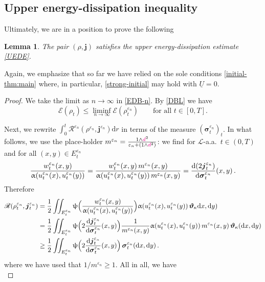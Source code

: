 \documentclass[11pt,reqno]{amsart}
\numberwithin{equation}{section}
\newcommand{\scrL}{\mathscr{L}}
\newcommand{\eps}{\varepsilon}
\newcommand{\dd}{\mathrm{d}}
\newtheorem{lemma}[theorem]{Lemma}
\theoremstyle{definition}
\newcommand{\ep}{\varepsilon}
\let\eps\ep
\def\dd{\mathrm{d}}
\newcommand{\teta}{\boldsymbol \vartheta}
\newcommand{\tetapi}{\boldsymbol{\teta}_{\kappa}}
\newcommand{\bj}{{\boldsymbol j}}
\newcommand{\scrR}{\mathscr{R}}
\newcommand{\scrE}{\mathscr{E}}
\newcommand{\jj}{{\boldsymbol{j}}}
\newcommand{\ej}{\eps_n}
\newcommand{\ssigma}{\boldsymbol \sigma}
\newcommand{\RBS}{\color{black}} %
\newcommand{\RNEW}{\color{black}} %
\newcommand{\EEE}{\color{black}}
\newcommand{\dpi}{{\color{magenta} d}}
\numberwithin{equation}{section}
\begin{document}
\subsection{Upper energy-dissipation inequality}
\label{ss:5.2}
Ultimately, we are in a position to prove the following 
\begin{lemma}
\label{l:UEDE}
The pair $(\rho,\bj)$ satisfies the upper energy-dissipation estimate \eqref{UEDE}. 
\end{lemma}
\RBS Again, we emphasize that so far we have relied on the sole conditions \eqref{initial-thm:main} where, in particular, \eqref{strong-initial}  may hold with
$\underline{U}=0$. \EEE
\begin{proof}
We take the limit as $n\to\infty$ in \eqref{EDB-n}. By \eqref{DBL} we have 
\begin{equation}
\label{lsc-energies}
\scrE(\rho_t) \leq \liminf_{n\to\infty} \scrE(\rho_t^{\ej}) \qquad \text{for all } t \in [0,T].
\end{equation}
\par
Next, we
rewrite $\int_0^t \scrR^{\ej}(\rho^{\ej}, \jj^{\ej}) \dd r$  in terms of the measure $(\ssigma_t^{\ej})_t$.
In what follows, we use the place-holder $m^{\ej} = \tfrac{1{\wedge} \dpi^2}{\ej +(1{\wedge} \dpi^2)}$:
we find  for  $\scrL$-a.a.\ $t\in (0,T)$ and  for all  $ (x,y)\in E_t^{\ej} $
\[
\frac{w_t^{\ej}(x,y)}{\upalpha(u_t^{\ej}(x),u_t^{\ej}(y))} = \frac{w_t^{\ej}(x,y) \, m^{\ej}(x,y)}{\upalpha(u_t^{\ej}(x),u_t^{\ej}(y)) \, m^{\ej}(x,y)} =
\frac{\dd (\RNEW 2\bj_t^{\ej})}{\dd \ssigma_t^{\ej}} (x,y) \,.
\]
Therefore
 \[
 \begin{aligned}
 \scrR(\rho_t^{\ej},\bj_t^{\ej})   & 
 = \frac12\iint_{E_t^{\ej}}%
    \uppsi\Bigl(\frac{w_t^{\ej}(x,y)}{\upalpha(u_t^{\ej}(x),u_t^{\ej}(y))}\Bigr) \upalpha(u_t^{\ej}(x),u_t^{\ej}(y))\,\tetapi \dd
    x,\dd y)
    \\
     & =  \frac12\iint_{E_t^{\ej}}%
    \uppsi\Bigl( 2\frac{\dd \bj_t^{\ej}}{\dd \ssigma_t^{\ej}} (x,y)  \Bigr)\frac1{m^{\ej}(x,y)}\upalpha(u_t^{\ej}(x),u_t^{\ej}(y))\, m^{\ej}(x,y) \,\tetapi(\dd
    x,\dd y)
    \\ &  \geq  \frac12\iint_{E_t^{\ej}}%
    \uppsi\Bigl( 2 \frac{\dd \bj_t^{\ej}}{\dd \ssigma_t^{\ej}} (x,y)  \Bigr)\,\ssigma_t^{\ej}(\dd
    x,\dd y)\,.
\end{aligned}
\]
where we have used that $1/m^{\ej} \geq 1$. 
All in all, %
we have 
\begin{equation}

\end{equation}
\end{proof}
\end{document}
